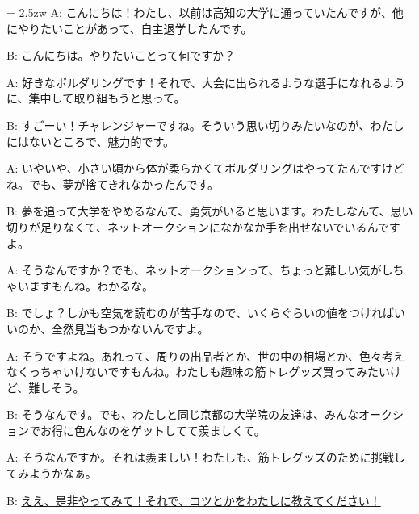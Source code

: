 \documentclass[11pt]{amsart}
\title{}
\author{}
\newenvironment{hangall}[1]{\hangindent = 2.5zw\everypar{\hangindent = 2.5zw}}{}
\begin{document}
\maketitle
\begin{hangall}{}%
A: こんにちは！わたし、以前は高知の大学に通っていたんですが、他にやりたいことがあって、自主退学したんです。

B: こんにちは。やりたいことって何ですか？

A: 好きなボルダリングです！それで、大会に出られるような選手になれるように、集中して取り組もうと思って。

B: すごーい！チャレンジャーですね。そういう思い切りみたいなのが、わたしにはないところで、魅力的です。

A: いやいや、小さい頃から体が柔らかくてボルダリングはやってたんですけどね。でも、夢が捨てきれなかったんです。

B: 夢を追って大学をやめるなんて、勇気がいると思います。わたしなんて、思い切りが足りなくて、ネットオークションになかなか手を出せないでいるんですよ。

A: そうなんですか？でも、ネットオークションって、ちょっと難しい気がしちゃいますもんね。わかるな。

B: でしょ？しかも空気を読むのが苦手なので、いくらぐらいの値をつければいいのか、全然見当もつかないんですよ。

A: そうですよね。あれって、周りの出品者とか、世の中の相場とか、色々考えなくっちゃいけないですもんね。わたしも趣味の筋トレグッズ買ってみたいけど、難しそう。

B: そうなんです。でも、わたしと同じ京都の大学院の友達は、みんなオークションでお得に色んなのをゲットしてて羨ましくて。

A: そうなんですか。それは羨ましい！わたしも、筋トレグッズのために挑戦してみようかなぁ。

B: \ul{ええ、是非やってみて！それで、コツとかをわたしに教えてください！}\end{hangall}
\end{document}
